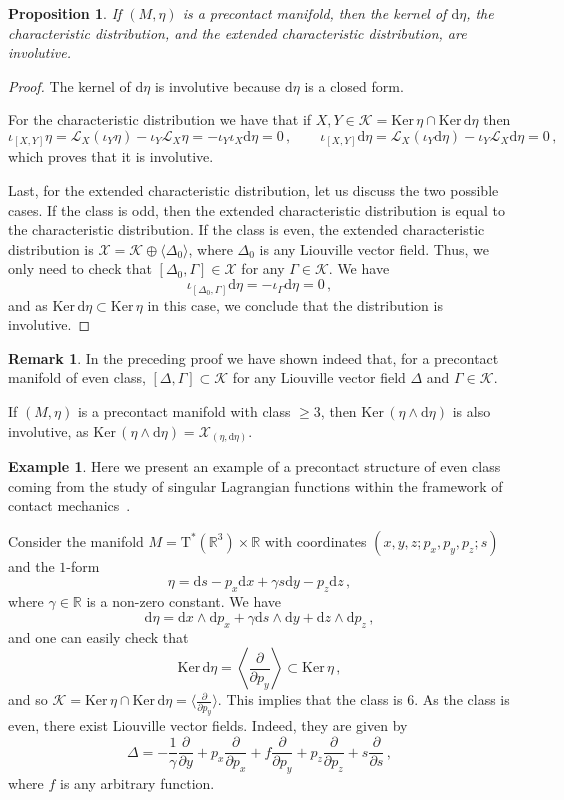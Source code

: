\documentclass[11pt,twoside]{article}
\theoremstyle{plain}
\newtheorem{proposition}[theorem]{Proposition}
\theoremstyle{definition}
\newtheorem{remark}[theorem]{Remark}
\newtheorem{example}[theorem]{Example}
\newcommand{\R}{\mathbb{R}}
\renewcommand{\d}{\mathrm{d}}
\newcommand{\T}{{\mathrm T}}
\let\Tan\T
\newcommand*{\inn}[1]{\iota_{#1}}
\newcommand{\Lie}{\mathscr{L}}
\def\d{\mathrm{d}}
\newcommand{\fracp}[2]{\frac{\partial #1}{\partial #2}}
\def\d{\mathrm{d}}
\def\Ker{\mathrm{Ker \,}}
\def\Tan{\mathrm{T}}
\def\Lie{\mathscr{L}}
\def\K{\mathcal{K}}
\begin{document}
\begin{proposition}\label{prop:preco_involutivity}
    If $(M,\eta)$ is a precontact manifold, then the kernel of $\d \eta$, the characteristic distribution, and the extended characteristic distribution, are involutive.
\end{proposition}
\begin{proof}
The kernel of $\d \eta$ is involutive because $\d \eta$ is a closed form.
    
For the characteristic distribution we have that if $X,Y \in \K = \Ker \eta \cap \Ker \d \eta$ then 
$$\inn{[X,Y]}\eta = \Lie_X (\inn{Y} \eta) - \inn{Y} \Lie _X \eta = -\inn{Y}\inn{X}\d\eta =0\,, 
\qquad
\inn{[X,Y]}\d \eta = \Lie_X (\inn{Y} \d \eta) - \inn{Y} \Lie _X \d \eta =  0\,, $$
which proves that it is involutive.

Last, for the extended characteristic distribution, let us discuss the two possible cases. If the class is odd, then the extended characteristic distribution is equal to the characteristic distribution. If the class is even, the extended characteristic distribution is $\mathcal{X}= \K \oplus \langle \Delta_0\rangle$, where $\Delta_0$ is any Liouville vector field. Thus, we only need to check that $[\Delta_0 ,\Gamma] \in \mathcal{X} $ for any $\Gamma \in \K$. We have
$$\inn{[\Delta_0, \Gamma]} \d\eta = -\inn{\Gamma} \d\eta = 0\,,$$
and as $\Ker \d \eta \subset \Ker \eta$ in this case, we conclude that the distribution is involutive. 
\end{proof}

\begin{remark}\label{rem:Liou_involutivity}
In the preceding proof we have shown indeed that,
for a precontact manifold of even class, 
$[\Delta,\Gamma]\subset \K$ for any Liouville vector field $\Delta$ and $\Gamma\in \K$.
\end{remark}


If $(M,\eta)$ is a precontact manifold with class $\geq 3$, then $\Ker (\eta \wedge \d \eta)$ is also involutive, as $\Ker (\eta \wedge \d \eta) = \mathcal{X}_{(\eta,\d \eta)}$.

\begin{example}
Here we present an example of a precontact structure of even class 
coming from the study of singular Lagrangian functions within the framework of contact mechanics~\cite{GMRR_2025}.

Consider the manifold $M = \Tan^*(\R ^3) \times \R$ with coordinates $(x,y,z;p_x,p_y,p_z;s)$ and the $1$-form
$$\eta = \d s - p_x \d x + \gamma s\d y - p_z\d z \,,$$
where $\gamma \in \R$ is a non-zero constant. We have
$$\d \eta = \d x \wedge \d p_x + \gamma \d s \wedge \d y + \d z \wedge \d p_z\,,$$
and one can easily check that 
$$\Ker \d \eta = \left\langle \fracp{}{p_y}\right\rangle \subset \Ker \eta\,,$$
and so 
$\K = \Ker \eta \cap \Ker \d \eta = \big\langle\fracp{}{p_y} \big\rangle$. This implies that the class is 6. As the class is even, there exist Liouville vector fields. Indeed, they are given by
$$\Delta = -\frac{1}{\gamma} \fracp{}{y} + p_x \fracp{}{p_x} + f\fracp{}{p_y} + p_z \fracp{}{p_z} + s\fracp{}{s}\,,$$
where $f$ is any arbitrary function.

\end{example}
\end{document}
